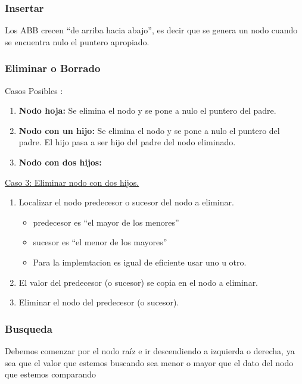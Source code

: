 \documentclass[../main.tex]{subfiles}
\begin{document}
        \subsubsection{Insertar} 
            Los ABB crecen “de arriba hacia abajo”, es decir que se genera un nodo cuando se encuentra nulo el puntero apropiado.
        
        \subsubsection{Eliminar o Borrado} 
            Casos Posibles \cite{ABB-Eliminar_nodos} :
            \begin{enumerate}
                \item \textbf{Nodo hoja:} Se elimina el nodo y se pone a nulo el puntero del padre.
                \item \textbf{Nodo con un hijo:} Se elimina el nodo y se pone a nulo el puntero del padre. El hijo pasa a ser hijo del padre del nodo eliminado.
                \item \textbf{Nodo con dos hijos:} 
            \end{enumerate}

            \underline{Caso 3: Eliminar nodo con dos hijos.}
            \begin{enumerate}
                \item Localizar el nodo predecesor o sucesor del nodo a eliminar.
                    \begin{itemize}
                        \item predecesor es “el mayor de los menores”
                        \item sucesor es “el menor de los mayores”
                        \item Para la implemtacion es igual de eficiente usar uno u otro.
                    \end{itemize}
                \item El valor del predecesor (o sucesor) se copia en el nodo a eliminar.
                \item Eliminar el nodo del predecesor (o sucesor).
            \end{enumerate}

        \subsubsection{Busqueda} 
            Debemos comenzar por el nodo raíz e ir descendiendo a izquierda o derecha, ya sea que el valor que estemos buscando sea menor o mayor que el dato del nodo que estemos comparando
\end{document}
